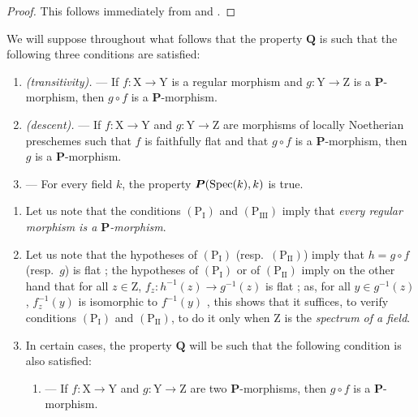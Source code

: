 \begin{proof}
This follows immediately from  and .
\end{proof}

\begin{env}[7.3.4]
\label{IV.7.3.4}
We will suppose throughout what follows that the property $\boldsymbol{Q}$ is such that the following three conditions are satisfied:
\begin{enumerate}
  \item[$(\mathrm{P_I})$] \emph{(transitivity).} ---
  If $f:\mathrm{X}\to\mathrm{Y}$ is a regular morphism  and $g:\mathrm{Y}\to\mathrm{Z}$ is a $\boldsymbol{P}$-morphism, then $g\circ f$ is a $\boldsymbol{P}$-morphism.
  \item[$(\mathrm{P_{II}})$] \emph{(descent).} ---
  If $f:\mathrm{X}\to\mathrm{Y}$ and $g:\mathrm{Y}\to\mathrm{Z}$ are morphisms of locally Noetherian preschemes such that $f$ is faithfully flat and that $g\circ f$ is a $\boldsymbol{P}$-morphism, then $g$ is a $\boldsymbol{P}$-morphism.
  \item[$(\mathrm{P_{III}})$] ---
  For every field $k$, the property $\boldsymbol{P}(\operatorname{Spec}(k),k)$ is true.
\end{enumerate}
\end{env}

\begin{remarks}[7.3.5]
\label{IV.7.3.5}
\begin{enumerate}[label=\emph{\roman*)}]
  \item Let us note that the conditions $(\mathrm{P_I})$ and $(\mathrm{P_{III}})$ imply that \emph{every regular morphism is a $\boldsymbol{P}$-morphism}.

  \item Let us note that the hypotheses of $(\mathrm{P_I})$ (resp.~$(\mathrm{P_{II}})$) imply that $h=g\circ f$ (resp.~$g$) is flat ; the hypotheses of $(\mathrm{P_I})$ or of $(\mathrm{P_{II}})$ imply on the other hand that for all $z\in\mathrm{Z}$, $f_z:h^{-1}(z)\to g^{-1}(z)$ is flat ; as, for all $y\in g^{-1}(z)$, $f_z^{-1}(y)$ is isomorphic to $f^{-1}(y)$ , this shows that it suffices, to verify conditions $(\mathrm{P_I})$ and $(\mathrm{P_{II}})$, to do it only when $\mathrm{Z}$ is the \emph{spectrum of a field}.

  \item In certain cases, the property $\boldsymbol{Q}$ will be such that the following condition is also satisfied:
  \begin{enumerate}
    \item[$(\mathrm{P'_I})$] ---
    If $f:\mathrm{X}\to\mathrm{Y}$ and $g:\mathrm{Y}\to\mathrm{Z}$ are two $\boldsymbol{P}$-morphisms, then $g\circ f$ is a $\boldsymbol{P}$-morphism.
  \end{enumerate}
\end{enumerate}
\end{remarks}

